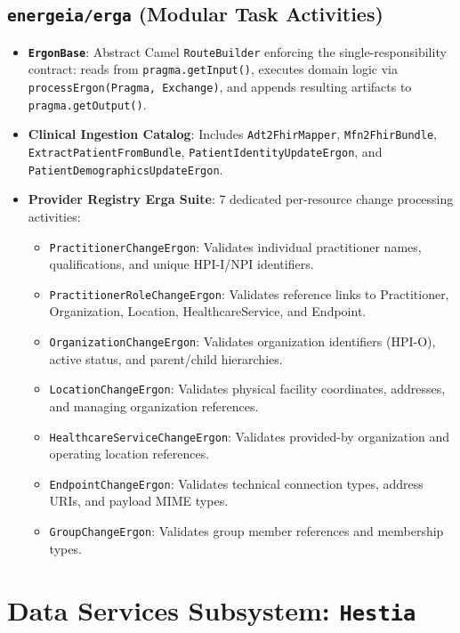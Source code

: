\subsection{\texttt{energeia/erga} (Modular Task Activities)}
\begin{itemize}
    \item \textbf{\texttt{ErgonBase}}: Abstract Camel \texttt{RouteBuilder} enforcing the single-responsibility contract: reads from \texttt{pragma.getInput()}, executes domain logic via \texttt{processErgon(Pragma, Exchange)}, and appends resulting artifacts to \texttt{pragma.getOutput()}.
    \item \textbf{Clinical Ingestion Catalog}: Includes \texttt{Adt2FhirMapper}, \texttt{Mfn2FhirBundle}, \texttt{ExtractPatientFromBundle}, \texttt{PatientIdentityUpdateErgon}, and \texttt{PatientDemographicsUpdateErgon}.
    \item \textbf{Provider Registry Erga Suite}: 7 dedicated per-resource change processing activities:
    \begin{itemize}
        \item \texttt{PractitionerChangeErgon}: Validates individual practitioner names, qualifications, and unique HPI-I/NPI identifiers.
        \item \texttt{PractitionerRoleChangeErgon}: Validates reference links to Practitioner, Organization, Location, HealthcareService, and Endpoint.
        \item \texttt{OrganizationChangeErgon}: Validates organization identifiers (HPI-O), active status, and parent/child hierarchies.
        \item \texttt{LocationChangeErgon}: Validates physical facility coordinates, addresses, and managing organization references.
        \item \texttt{HealthcareServiceChangeErgon}: Validates provided-by organization and operating location references.
        \item \texttt{EndpointChangeErgon}: Validates technical connection types, address URIs, and payload MIME types.
        \item \texttt{GroupChangeErgon}: Validates group member references and membership types.
    \end{itemize}
\end{itemize}

\section{Data Services Subsystem: \texttt{Hestia}}

